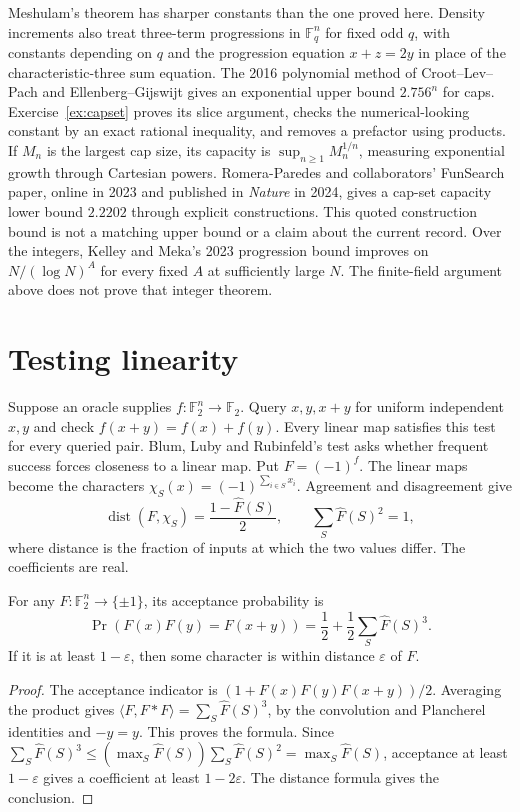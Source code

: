 Meshulam's theorem has sharper constants than the one proved here. Density increments also treat three-term progressions in $\mathbb F_q^n$ for fixed odd $q$, with constants depending on $q$ and the progression equation $x+z=2y$ in place of the characteristic-three sum equation.
The 2016 polynomial method of Croot--Lev--Pach and Ellenberg--Gijswijt gives an exponential upper bound $2.756^n$ for caps. Exercise~\ref{ex:capset} proves its slice argument, checks the numerical-looking constant by an exact rational inequality, and removes a prefactor using products. If $M_n$ is the largest cap size, its capacity is $\sup_{n\ge1}M_n^{1/n}$, measuring exponential growth through Cartesian powers. Romera-Paredes and collaborators' FunSearch paper, online in 2023 and published in \emph{Nature} in 2024, gives a cap-set capacity lower bound $2.2202$ through explicit constructions. This quoted construction bound is not a matching upper bound or a claim about the current record. Over the integers, Kelley and Meka's 2023 progression bound improves on $N/(\log N)^A$ for every fixed $A$ at sufficiently large $N$. The finite-field argument above does not prove that integer theorem.

\section{Testing linearity}\label{sec:blr}

Suppose an oracle supplies $f:\mathbb F_2^n\to\mathbb F_2$. Query $x,y,x+y$ for uniform independent $x,y$ and check $f(x+y)=f(x)+f(y)$. Every linear map satisfies this test for every queried pair. Blum, Luby and Rubinfeld's test asks whether frequent success forces closeness to a linear map.
Put $F=(-1)^f$. The linear maps become the characters $\chi_S(x)=(-1)^{\sum_{i\in S}x_i}$. Agreement and disagreement give
\[
\operatorname{dist}(F,\chi_S)=\frac{1-\hat F(S)}2,
\qquad \sum_S\hat F(S)^2=1,
\]
where distance is the fraction of inputs at which the two values differ. The coefficients are real.

\begin{theorem}\label{thm:blr}
For any $F:\mathbb F_2^n\to\{\pm1\}$, its acceptance probability is
\[
\Pr(F(x)F(y)=F(x+y))=\frac12+\frac12\sum_S\hat F(S)^3.
\]
If it is at least $1-\varepsilon$, then some character is within distance $\varepsilon$ of $F$.
\end{theorem}
\begin{proof}
The acceptance indicator is $(1+F(x)F(y)F(x+y))/2$. Averaging the product gives $\langle F,F*F\rangle=\sum_S\hat F(S)^3$, by the convolution and Plancherel identities and $-y=y$. This proves the formula. Since
$\sum_S\hat F(S)^3\le(\max_S\hat F(S))\sum_S\hat F(S)^2=\max_S\hat F(S)$,
acceptance at least $1-\varepsilon$ gives a coefficient at least $1-2\varepsilon$. The distance formula gives the conclusion.
\end{proof}

